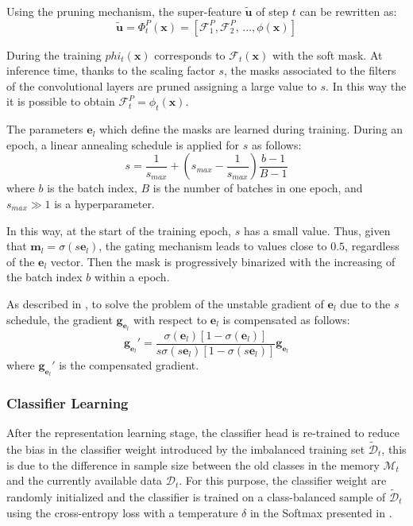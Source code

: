 Using the pruning mechanism, the super-feature $\tilde{\textbf{u}}$ of step $t$ can be rewritten as:
\begin{equation}
    \tilde{\textbf{u}} = \Phi_t^P(\textbf{x}) = [\mathcal{F}_1^P, \mathcal{F}_2^P,\, ..., \phi(\textbf{x})]
\end{equation}

During the training $phi_t(\textbf{x})$ corresponds to $\mathcal{F}_t(\textbf{x})$ with the soft mask. At inference time, thanks to the scaling factor $s$, the masks associated to the filters of the convolutional layers are pruned assigning a large value to $s$. In this way the it is possible to obtain $\mathcal{F}_t^P = \phi_t(\textbf{x})$.

The parameters $\textbf{e}_l$ which define the masks are learned during training. During an epoch, a linear annealing schedule is applied for $s$ as follows:
\begin{equation}
    s = \frac{1}{s_{max}} + (s_{max}- \frac{1}{s_{max}}) \frac{b-1}{B-1}
\end{equation}
where $b$ is the batch index, $B$ is the number of batches in one epoch, and $s_{max} \gg 1$ is a hyperparameter.

In this way, at the start of the training epoch, $s$ has a small value. Thus, given that $\textbf{m}_l=\sigma(s \textbf{e}_l)$, the gating mechanism leads to values close to $0.5$, regardless of the $\textbf{e}_l$ vector. Then the mask is progressively binarized with the increasing of the batch index $b$ within a epoch.

As described in \cite{serra2018overcoming}, to solve the problem of the unstable gradient of $\textbf{e}_l$ due to the $s$ schedule, the gradient $\textbf{g}_{\textbf{e}_l}$ with respect to $\textbf{e}_l$ is compensated as follows:
\begin{equation}
    \textbf{g}_{\textbf{e}_l} ' = \frac{\sigma(\textbf{e}_l)[1-\sigma(\textbf{e}_l)]}{s\sigma(s\textbf{e}_l)[1-\sigma(s\textbf{e}_l)]}\textbf{g}_{\textbf{e}_l}
\end{equation}
where $\textbf{g}_{\textbf{e}_l} '$ is the compensated gradient.


\subsubsection{Classifier Learning}
After the representation learning stage, the classifier head is re-trained to reduce the bias in the classifier weight introduced by the imbalanced training set $\tilde{\mathcal{D}}_t$, this is due to the difference in sample size between the old classes in the memory $\mathcal{M}_t$ and the currently available data $\mathcal{D}_t$. For this purpose, the classifier weight are randomly initialized and the classifier is trained on a class-balanced sample of $\tilde{\mathcal{D}}_t$ using the cross-entropy loss with a temperature $\delta$ in the Softmax presented in \cite{zhao2020maintaining}. 

